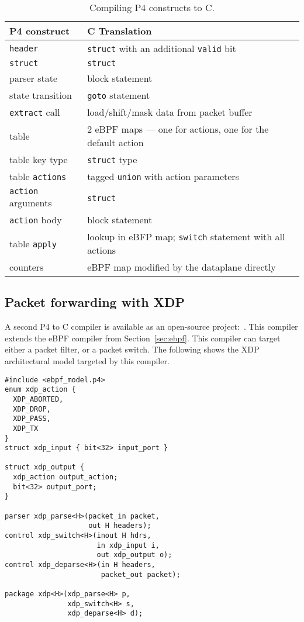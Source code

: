 \begin{table}[h]
  \footnotesize
  \begin{center}
  \begin{tabular}{|l|p{5cm}|} \hline
    \textbf{P4 construct} & \textbf{C Translation} \\ \hline \hline
    \texttt{header} & \texttt{struct} with an additional \texttt{valid} bit \\ \hline
    \texttt{struct} & \texttt{struct} \\ \hline
    parser state    & block statement \\ \hline
    state transition & \texttt{goto} statement \\ \hline
    \texttt{extract} call & load/shift/mask data from packet buffer \\ \hline
    table & 2 eBPF maps --- one for actions, one for the default action \\ \hline
    table key type & \texttt{struct} type \\ \hline
    table \texttt{actions} & tagged \texttt{union} with action parameters \\ \hline
    \texttt{action} arguments & \texttt{struct} \\ \hline
    \texttt{action} body & block statement \\ \hline
    table \texttt{apply} & lookup in eBFP map; \texttt{switch} statement with all actions \\ \hline
    counters & eBPF map modified by the dataplane directly \\ \hline
  \end{tabular}
  \end{center}
  \caption{Compiling P4 constructs to C.}\label{table:translation}
\end{table}

\subsection{Packet forwarding with XDP}\label{sec:xdp}

A second P4 to C compiler is available as an open-source
project:~\cite{p4-xdp-backend}.  This compiler extends the eBPF
compiler from Section~\ref{sec:ebpf}.  This compiler can target either
a packet filter, or a packet switch.  The following shows the XDP
architectural model targeted by this compiler.

\begin{lstlisting}
#include <ebpf_model.p4>
enum xdp_action {
  XDP_ABORTED,
  XDP_DROP,
  XDP_PASS,
  XDP_TX
}
struct xdp_input { bit<32> input_port }

struct xdp_output {
  xdp_action output_action;
  bit<32> output_port;
}

parser xdp_parse<H>(packet_in packet,
                    out H headers);
control xdp_switch<H>(inout H hdrs,
                      in xdp_input i,
                      out xdp_output o);
control xdp_deparse<H>(in H headers,
                       packet_out packet);

package xdp<H>(xdp_parse<H> p,
               xdp_switch<H> s,
               xdp_deparse<H> d);
\end{lstlisting}

